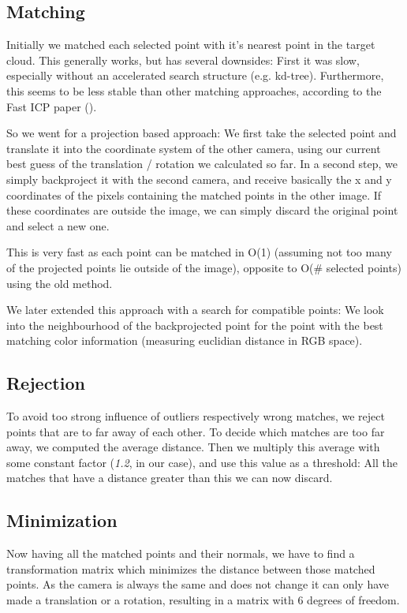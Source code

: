 \documentclass[10pt,twocolumn,letterpaper]{article}
\begin{document}
\subsection{Matching}
\label{backprojection}

Initially we matched each selected point with it's nearest point in the target cloud. 
This generally works, but has several downsides: First it was slow, especially without an accelerated search structure (e.g. kd-tree). 
Furthermore, this seems to be less stable than other matching approaches, according to the Fast ICP paper (\cite{fasticp}).

So we went for a projection based approach: We first take the selected point and translate it into the coordinate system of the other camera,
using our current best guess of the translation / rotation we calculated so far. In a second step, we simply backproject it with the second camera,
and receive basically the x and y coordinates of the pixels containing the matched points in the other image. If these coordinates are outside the image,
we can simply discard the original point and select a new one.

This is very fast as each point can be matched in O(1) (assuming not too many of the projected points lie outside of the image), opposite to
O(\# selected points) using the old method.

We later extended this approach with a search for compatible points: We look into the neighbourhood of the backprojected point
for the point with the best matching color information (measuring euclidian distance in RGB space).

\subsection{Rejection}
To avoid too strong influence of outliers respectively wrong matches, we reject points that are to far away of each other. 
To decide which matches are too far away, we computed the average distance. Then we multiply this average with some constant
factor (\textit{1.2}, in our case), and use this value as a threshold: All the matches that have a distance greater than this
we can now discard.

\subsection{Minimization}
\label{minimization}
Now having all the matched points and their normals, we have to find a transformation matrix which minimizes the distance between those matched points.
As the camera is always the same and does not change it can only have made a translation or a rotation, resulting in a matrix with 6 degrees of freedom.
\end{document}
